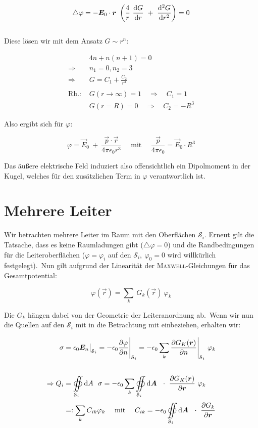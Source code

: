 \begin{equation*}
\bigtriangleup\varphi = -\vec{E}_0\cdot\vec{r} \ \left(\frac{4}{r} \ \diff{G}{r} \ + \ \ddiff{G}{r}\right) = 0
\end{equation*}
\ \\
Diese lösen wir mit dem Ansatz $ G \sim r^n$:


\begin{align*}
& 4n + n(n+1) = 0\\
\Rightarrow & n_1 = 0, n_2=3\\
\Rightarrow & G = C_1 + \frac{C_2}{r^3}\\
\ \\
\text{Rb.: } & G(r\rightarrow\infty) = 1 \quad \Rightarrow \quad C_1 = 1\\
& G(r=R) = 0 \quad \Rightarrow \quad C_2 = -R^3 
\end{align*}

Also ergibt sich für $\varphi$:

\begin{equation*}
\varphi = \vec{E}_0 \ + \ \frac{\vec{p} \cdot\vec{r}}{4\pi\epsilon_0 r^3} \quad
 \text{ mit } \quad \frac{\vec{p}}{4\pi\epsilon_0} = \vec{E}_0 \cdot R^3
\end{equation*}

Das äußere elektrische Feld induziert also offensichtlich ein Dipolmoment in der Kugel, welches für den zusätzlichen Term in $\varphi$ verantwortlich ist.

\section{Mehrere Leiter}

Wir betrachten mehrere Leiter im Raum mit den Oberflächen $\mathcal{S}_i$. Erneut gilt die Tatsache, dass es keine Raumladungen gibt ($\bigtriangleup\varphi = 0$) und die Randbedingungen für die Leiteroberflächen ($\varphi = \varphi_i$ auf den $\mathcal{S}_i, \ \varphi_0 = 0$ wird willkürlich festgelegt).\
Nun gilt aufgrund der Linearität der \textsc{Maxwell}-Gleichungen für das Gesamtpotential:

\begin{equation*}
\varphi (\vec{r}) = \sum_k \ G_k(\vec{r}) \ \varphi_k
\end{equation*}

Die $G_k$ hängen dabei von der Geometrie der Leiteranordnung ab.\
Wenn wir nun die Quellen auf den $\mathcal{S}_i$ mit in die Betrachtung mit einbeziehen, erhalten wir: 

\begin{align*}
\sigma &= \epsilon_0 \vec{E}_n\big|_{\mathcal{S}_i}  = -\epsilon_0 \pdiff{\varphi}{n}\Bigg|_{\mathcal{S}_i} = - \epsilon_0 \sum_k \pdiff{G_K(\vec{r})}{n}\Bigg|_{\mathcal{S}_i} \ \varphi_k \\
\ \\
\Rightarrow Q_i &= \Oiint{\mathcal{S}_i}{}{A} \ \sigma = -\epsilon_0\sum_k\Oiint{\mathcal{S}_i}{}{\vec{A}}\  \cdot \ \pdiff{G_K(\vec{r})}{\vec{r}} \ \varphi_k\\
&=: \sum_k C_{ik} \varphi_k \quad \text{ mit } \quad C_{ik} = -\epsilon_0 \Oiint{\mathcal{S}_i}{}{\vec{A}} \ \cdot \ \pdiff{G_k}{\vec{r}}
\end{align*}


